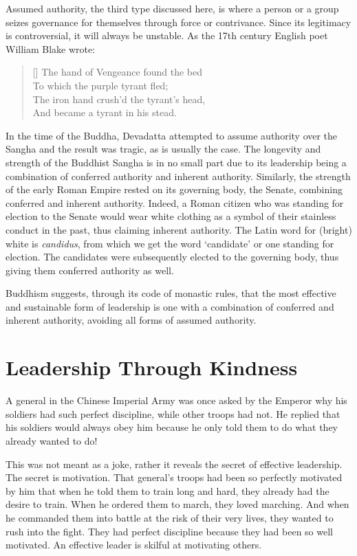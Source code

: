 ﻿\documentclass[11pt, openany]{book}
\begin{document}
Assumed authority, the third type discussed here, is where a person or a group seizes governance for themselves through force or contrivance. Since its legitimacy is controversial, it will always be unstable. As the 17th century English poet William Blake wrote:

\begin{verse} [\versewidth]
The hand of Vengeance found the bed\\
To which the purple tyrant fled;\\
The iron hand crush’d the tyrant’s head,\\
And became a tyrant in his stead.
\end{verse}

In the time of the Buddha, Devadatta attempted to assume authority over the Sangha and the result was tragic, as is usually the case. The longevity and strength of the Buddhist Sangha is in no small part due to its leadership being a combination of conferred authority and inherent authority. Similarly, the strength of the early Roman Empire rested on its governing body, the Senate, combining conferred and inherent authority. Indeed, a Roman citizen who was standing for election to the Senate would wear white clothing as a symbol of their stainless conduct in the past, thus claiming inherent authority. The Latin word for (bright) white is \emph{candidus}, from which we get the word ‘candidate’ or one standing for election. The candidates were subsequently elected to the governing body, thus giving them conferred authority as well.

Buddhism suggests, through its code of monastic rules, that the most effective and sustainable form of leadership is one with a combination of conferred and inherent authority, avoiding all forms of assumed authority.

\section{Leadership Through Kindness}

A general in the Chinese Imperial Army was once asked by the Emperor why his soldiers had such perfect discipline, while other troops had not. He replied that his soldiers would always obey him because he only told them to do what they already wanted to do!

This was not meant as a joke, rather it reveals the secret of effective leadership. The secret is motivation. That general’s troops had been so perfectly motivated by him that when he told them to train long and hard, they already had the desire to train. When he ordered them to march, they loved marching. And when he commanded them into battle at the risk of their very lives, they wanted to rush into the fight. They had perfect discipline because they had been so well motivated. An effective leader is skilful at motivating others.
\end{document}

